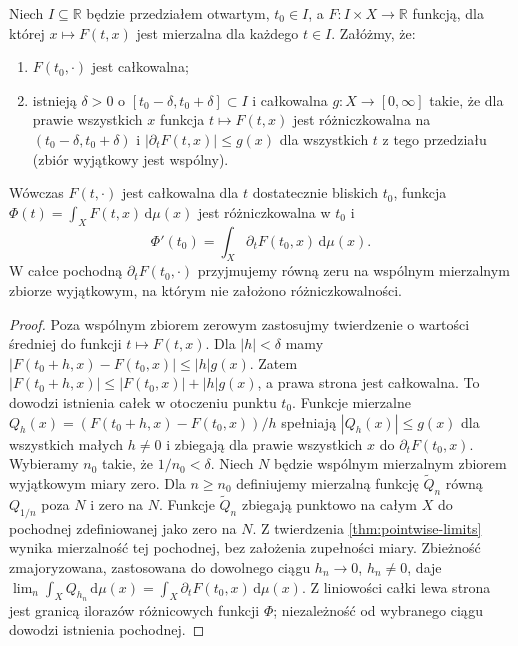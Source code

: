 \begin{twierdzenie}
\label{thm:differentiating-integrals}
Niech $I\subseteq\mathbb R$ będzie przedziałem otwartym,
$t_0\in I$, a $F:I\times X\to\mathbb R$ funkcją,
dla której $x\mapsto F(t,x)$ jest mierzalna
dla każdego $t\in I$. Załóżmy, że:
\begin{enumerate}[label=\textup{(\roman*)}]
\item $F(t_0,\cdot)$ jest całkowalna;
\item istnieją $\delta>0$ o
$[t_0-\delta,t_0+\delta]\subset I$ i całkowalna
$g:X\to[0,\infty]$ takie, że dla prawie wszystkich
$x$ funkcja $t\mapsto F(t,x)$ jest różniczkowalna
na $(t_0-\delta,t_0+\delta)$ i
$|\partial_tF(t,x)|\le g(x)$ dla wszystkich $t$ z
tego przedziału (zbiór wyjątkowy jest wspólny).
\end{enumerate}
Wówczas $F(t,\cdot)$ jest całkowalna dla
$t$ dostatecznie bliskich $t_0$, funkcja
$\Phi(t)=\int_XF(t,x)\,\mathrm d\mu(x)$ jest
różniczkowalna w $t_0$ i
\begin{equation}\label{eq:differentiation-under-integral}
\Phi'(t_0)=\int_X\partial_tF(t_0,x)\,\mathrm d\mu(x).
\end{equation}
W całce pochodną $\partial_tF(t_0,\cdot)$ przyjmujemy
równą zeru na wspólnym mierzalnym zbiorze wyjątkowym,
na którym nie założono różniczkowalności.
\end{twierdzenie}
\begin{proof}
Poza wspólnym zbiorem zerowym zastosujmy twierdzenie
o wartości średniej do funkcji $t\mapsto F(t,x)$.
Dla $|h|<\delta$ mamy
$|F(t_0+h,x)-F(t_0,x)|\le |h|g(x)$.
Zatem $|F(t_0+h,x)|\le|F(t_0,x)|+|h|g(x)$,
a prawa strona jest całkowalna. To dowodzi
istnienia całek w otoczeniu punktu $t_0$.
Funkcje mierzalne
$Q_h(x)=(F(t_0+h,x)-F(t_0,x))/h$ spełniają
$|Q_h(x)|\le g(x)$ dla wszystkich małych $h\ne0$
i zbiegają dla prawie wszystkich $x$ do
$\partial_tF(t_0,x)$. Wybieramy $n_0$ takie, że $1/n_0<\delta$.
Niech $N$ będzie wspólnym mierzalnym zbiorem wyjątkowym
miary zero. Dla $n\ge n_0$ definiujemy mierzalną funkcję
$\widetilde Q_n$ równą $Q_{1/n}$ poza $N$ i zero na $N$.
Funkcje $\widetilde Q_n$ zbiegają punktowo na całym $X$
do pochodnej zdefiniowanej jako zero na $N$.
Z twierdzenia \ref{thm:pointwise-limits} wynika mierzalność
tej pochodnej, bez założenia zupełności miary. Zbieżność zmajoryzowana,
zastosowana do dowolnego ciągu $h_n\to0$,
$h_n\ne0$, daje
$\lim_n\int_XQ_{h_n}\,\mathrm d\mu(x)
=\int_X\partial_tF(t_0,x)\,\mathrm d\mu(x)$.
Z liniowości całki lewa strona jest granicą
ilorazów różnicowych funkcji $\Phi$; niezależność
od wybranego ciągu dowodzi istnienia pochodnej.
\end{proof}

